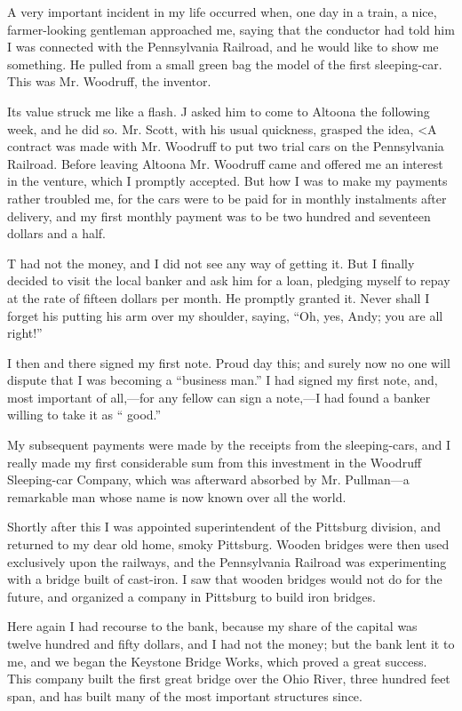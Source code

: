 \documentclass[11pt,openany]{book}
\begin{document}
A very important incident in my life occurred when, one day in a train, a nice, farmer-looking gentleman approached me, saying that the conductor had told him I was connected with the Pennsylvania Railroad, and he would like to show me something. He pulled from a small green bag the model of the first sleeping-car. This was Mr. Woodruff, the inventor.

Its value struck me like a flash. J asked him to come to Altoona the following week, and he did so. Mr. Scott, with his usual quickness, grasped the idea, <A contract was made with Mr. Woodruff to put two trial cars on the Pennsylvania Railroad. Before leaving Altoona Mr. Woodruff came and offered me an interest in the venture, which I promptly accepted. But how I was to make my payments rather troubled me, for the cars were to be paid for in monthly instalments after delivery, and my first monthly payment was to be two hundred and seventeen dollars and a half.

T had not the money, and I did not see any way of getting it. But I finally decided to visit the local banker and ask him for a loan, pledging myself to repay at the rate of fifteen dollars per month. He promptly granted it. Never shall I forget his putting his arm over my shoulder, saying, ``Oh, yes, Andy; you are all right!''

I then and there signed my first note. Proud day this; and surely now no one will dispute that I was becoming a ``business man.'' I had signed my first note, and, most important of all,---for any fellow can sign a note,---I had found a banker willing to take it as `` good.''

My subsequent payments were made by the receipts from the sleeping-cars, and I really made my first considerable sum from this investment in the Woodruff Sleeping-car Company, which was afterward absorbed by Mr. Pullman---a remarkable man whose name is now known over all the world.

Shortly after this I was appointed superintendent of the Pittsburg division, and returned to my dear old home, smoky Pittsburg. Wooden bridges were then used exclusively upon the railways, and the Pennsylvania Railroad was experimenting with a bridge built of cast-iron. I saw that wooden bridges would not do for the future, and organized a company in Pittsburg to build iron bridges.

Here again I had recourse to the bank, because my share of the capital was twelve hundred and fifty dollars, and I had not the money; but the bank lent it to me, and we began the Keystone Bridge Works, which proved a great success. This company built the first great bridge over the Ohio River, three hundred feet span, and has built many of the most important structures since.
\end{document}
